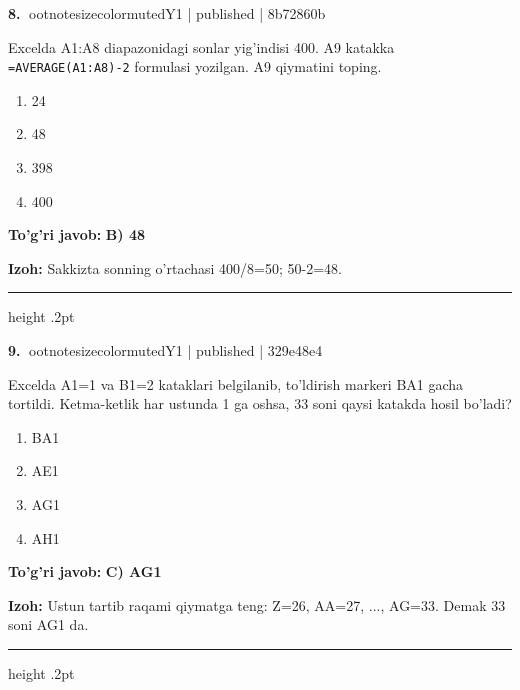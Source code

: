 \documentclass[10pt,a4paper]{article}
\begin{document}
\textbf{\color{ink}8.} {ootnotesizecolor{muted}Y1 | published | 8b72860b}
\par
Excelda A1:A8 diapazonidagi sonlar yig'indisi 400. A9 katakka \texttt{=AVERAGE(A1:A8)-2} formulasi yozilgan. A9 qiymatini toping.
\begin{enumerate}[label=\Alph*),leftmargin=9mm]
\item 24
\item 48
\item 398
\item 400
\end{enumerate}
\begin{tcolorbox}[enhanced,breakable,colback=teal!4,colframe=teal!55!black,boxrule=0.45pt,arc=1.2mm,left=2.8mm,right=2.8mm,top=2mm,bottom=2mm]
\textbf{\color{teal}To'g'ri javob:} \textbf{B) 48}
\par\smallskip
\textbf{Izoh:} Sakkizta sonning o'rtachasi 400/8=50; 50-2=48.
\end{tcolorbox}
\vspace{2mm}\hrule height .2pt\vspace{2mm}

\textbf{\color{ink}9.} {ootnotesizecolor{muted}Y1 | published | 329e48e4}
\par
Excelda A1=1 va B1=2 kataklari belgilanib, to'ldirish markeri BA1 gacha tortildi. Ketma-ketlik har ustunda 1 ga oshsa, 33 soni qaysi katakda hosil bo'ladi?
\begin{enumerate}[label=\Alph*),leftmargin=9mm]
\item BA1
\item AE1
\item AG1
\item AH1
\end{enumerate}
\begin{tcolorbox}[enhanced,breakable,colback=teal!4,colframe=teal!55!black,boxrule=0.45pt,arc=1.2mm,left=2.8mm,right=2.8mm,top=2mm,bottom=2mm]
\textbf{\color{teal}To'g'ri javob:} \textbf{C) AG1}
\par\smallskip
\textbf{Izoh:} Ustun tartib raqami qiymatga teng: Z=26, AA=27, ..., AG=33. Demak 33 soni AG1 da.
\end{tcolorbox}
\vspace{2mm}\hrule height .2pt\vspace{2mm}
\end{document}
